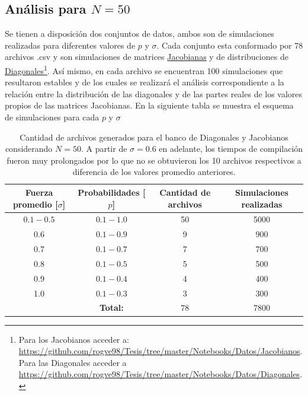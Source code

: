 \subsection{Análisis para $N=50$}

Se tienen a disposición dos conjuntos de datos, ambos son de simulaciones realizadas para diferentes valores de $p$ y $\sigma$. Cada conjunto esta conformado por 78 archivos .csv y son simulaciones de matrices \href{https://github.com/rogve98/Tesis/tree/master/Notebooks/Datos/Jacobianos}{Jacobianas} y de distribuciones de \href{https://github.com/rogve98/Tesis/tree/master/Notebooks/Datos/Diagonales}{Diagonales}\footnote{Para los Jacobianos acceder a: \url{https://github.com/rogve98/Tesis/tree/master/Notebooks/Datos/Jacobianos}. Para las Diagonales acceder a \url{https://github.com/rogve98/Tesis/tree/master/Notebooks/Datos/Diagonales}.}. Así mismo, en cada archivo se encuentran 100 simulaciones que resultaron estables y de los cuales se realizará el análisis correspondiente a la relación entre la distribución de las diagonales y de las partes reales de los valores propios de las matrices Jacobianas. En la siguiente tabla se muestra el esquema de simulaciones para cada $p$ y $\sigma$
\begin{table}[h!]
	\centering
	\begin{tabular}{|c|c|c|c|}
		\hline
		Fuerza promedio [$\sigma$] & Probabilidades [$p$] & Cantidad de archivos & Simulaciones realizadas \\ \hline
		$0.1-0.5$  & $0.1-1.0$  & 50 & 5000  \\ \hline
		0.6  & $0.1-0.9$  & 9 & 900 \\ \hline
		0.7  & $0.1-0.7$  & 7 & 700 \\ \hline
		0.8  & $0.1-0.5$  & 5 & 500 \\ \hline
		0.9  & $0.1-0.4$  & 4 & 400 \\ \hline
		1.0  & $0.1-0.3$  & 3 & 300 \\ \hline
		& \textbf{Total:} & 78& 7800\\ \hline
	\end{tabular}
	\caption{Cantidad de archivos generados para el banco de Diagonales y Jacobianos considerando $N=50$. A partir de $\sigma=0.6$ en adelante, los tiempos de compilación fueron muy prolongados por lo que no se obtuvieron los 10 archivos respectivos a diferencia de los valores promedio anteriores.}
	\label{tab:Simulaciones}
\end{table} 

